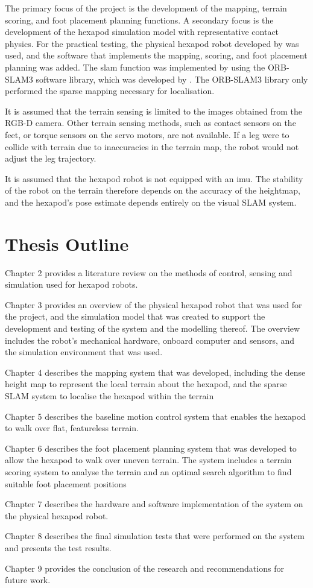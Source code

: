     The primary focus of the project is the development of the mapping, terrain scoring, and foot placement planning
    functions. A secondary focus is the development of the hexapod simulation model with representative contact physics.
    For the practical testing, the physical hexapod robot developed by \cite{erasmus2023guidance} was used, and the software
    that implements the  mapping, scoring, and foot placement planning was added. The \ac{slam} function was implemented
    by using the ORB-SLAM3 software library, which was developed by \cite{campos2021orb}. The ORB-SLAM3 library only performed
    the sparse mapping necessary for localisation.

    It is assumed that the terrain sensing is limited to the images obtained from the RGB-D camera. Other terrain
    sensing methods, such as contact sensors on the feet, or torque sensors on the servo motors, are not available.
    If a leg were to collide with terrain due to inaccuracies in the terrain map, the robot would not adjust the leg trajectory.

    It is assumed that the hexapod robot is not equipped with an \ac{imu}. The stability of the
    robot on the terrain therefore depends on the accuracy of the heightmap, and the hexapod's pose estimate depends
    entirely on the visual SLAM system.

\section{Thesis Outline}

    Chapter 2 provides a literature review on the methods of control, sensing and simulation used for hexapod robots.

    Chapter 3 provides an overview of the physical hexapod robot that was used for the project, and the simulation model that was created to
    support the development and testing of the system and the modelling thereof. The overview includes the robot's mechanical hardware,
    onboard computer and sensors, and the simulation environment that was used.

    Chapter 4 describes the mapping system that was developed, including the dense height map to represent
    the local terrain about the hexapod, and the sparse SLAM system to localise the hexapod within the terrain

    Chapter 5 describes the baseline motion control system that enables the hexapod to walk over flat, featureless terrain.

    Chapter 6 describes the foot placement planning system that was developed to allow the hexapod to walk over
    uneven terrain. The system includes a terrain scoring system to analyse the terrain and an optimal search algorithm to find suitable foot placement positions

    Chapter 7 describes the hardware and software implementation of the system on the physical hexapod robot.

    Chapter 8 describes the final simulation tests that were performed on the system and presents the test results.

    Chapter 9 provides the conclusion of the research and recommendations for future work.

